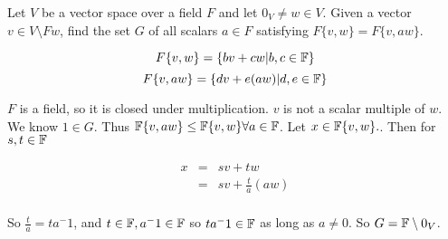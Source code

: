\begin{problem}[Golan 105]

Let $V$ be a vector space over a field $F$ and let $0_V \neq w \in V$.  Given a
vector $v \in V \setminus Fw$, find the set $G$ of all scalars $a \in F$
satisfying $F\{v, w\} = F\{v, aw\}$.

\end{problem}
\smallskip
\begin{solution}

$$F\{v,w\} = \{bv + cw | b,c \in \mathbb{F} \} $$
$$F\{v,aw\} = \{dv + e(aw) | d,e \in \mathbb{F}\}$$

$F$ is a field, so it is closed under multiplication. $v$ is not a scalar multiple of $w$. We know $1 \in G$. Thus $\mathbb{F}\{v,aw\} \leq \mathbb{F}\{v,w\} \forall a \in \mathbb{F}$. Let $x \in \mathbb{F}\{v,w\}.$. Then for $s,t \in \mathbb{F}$

\begin{eqnarray*}
x & = & sv + tw  \\
  & = & sv + \frac{t}{a}(aw) \\
\end{eqnarray*}

So $\frac{t}{a} = ta^-1$, and $t \in \mathbb{F}, a^-1 \in \mathbb{F}$ so $ta^-1 \in \mathbb{F}$ as long as $a \neq 0$. So $G = \mathbb{F} \setminus 0_V$.
\end{solution}
\probskip







